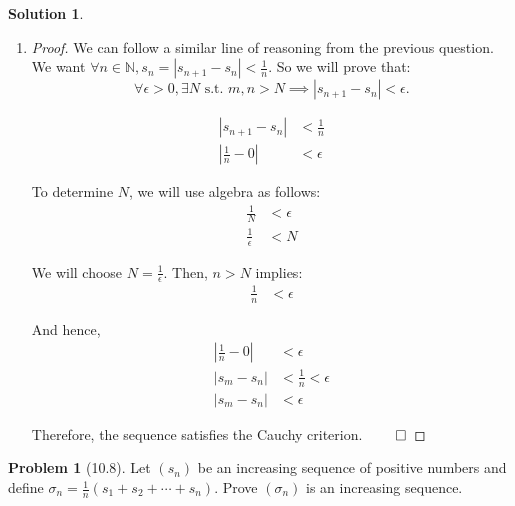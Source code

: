 \documentclass[12pt]{article}
\theoremstyle{definition} %
\newtheorem{solution}{Solution}
\newtheorem{problem}{Problem}
\theoremstyle{plain} %
\begin{document}
\begin{solution}
\begin{enumerate}
\begin{proof}
            Therefore, the sequence \(s_n\) is Cauchy, as required. \(\qed\)
        \end{proof}
        \item \begin{proof}
            We can follow a similar line of reasoning from the previous question. We want \(\forall n \in \mathbb{N}, s_n = |s_{n+1} - s_n| < \frac{1}{n}\). So we will prove that:
            \[
            \forall \epsilon > 0, \exists N \text{ s.t. } m, n > N \implies |s_{n+1} - s_n| < \epsilon.
            \]
        
            \begin{align}
                |s_{n+1} - s_n| &< \frac{1}{n} \tag{40} \\
                \left| \frac{1}{n} - 0 \right| &< \epsilon \tag{41}
            \end{align}
        
            To determine \(N\), we will use algebra as follows:
            \begin{align}
                \frac{1}{N} &< \epsilon \tag{42} \\
                \frac{1}{\epsilon} &< N \tag{43}
            \end{align}
        
            We will choose \(N = \frac{1}{\epsilon}\). Then, \(n > N\) implies:
            \begin{align}
                \frac{1}{n} &< \epsilon \tag{44}
            \end{align}
        
            And hence,
            \begin{align}
                \left| \frac{1}{n} - 0 \right| &< \epsilon \tag{45} \\
                |s_m - s_n| &< \frac{1}{n} < \epsilon \tag{46} \\
                |s_m - s_n| &< \epsilon \tag{47}
            \end{align}
        
            Therefore, the sequence satisfies the Cauchy criterion. \(\qed\)
        \end{proof}
    \end{enumerate}
\end{solution}

\begin{problem}[10.8]
    Let $(s_n)$ be an increasing sequence of positive numbers and define $\sigma_n = \frac{1}{n} (s_1 + s_2 + \cdots + s_n)$. Prove $(\sigma_n)$ is an increasing sequence.
\end{problem}
\end{document}
